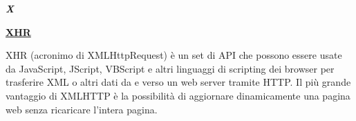 \newpage

\cleardoublepage
{}
{}
\noindent\hrulefill\hspace{4mm}\textbf{\textsl{\Huge{X}}}\hspace{4mm}\hrulefill
\vspace*{2\bigskipamount}

\begin{addmargin}[0em]{0em}
	\textbf{\underline{XHR}}
\end{addmargin} 

\medskip
\begin{addmargin}[5em]{1em}
 XHR (acronimo di XMLHttpRequest) è un set di API che possono essere usate da JavaScript, JScript, VBScript e altri linguaggi di scripting dei browser per trasferire XML o altri dati da e verso un web server tramite HTTP. Il più grande vantaggio di XMLHTTP è la possibilità di aggiornare dinamicamente una pagina web senza ricaricare l'intera pagina.
\end{addmargin}

		
